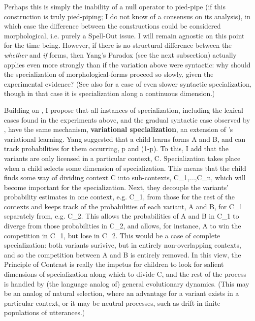 \documentclass{artikel3}
\begin{document}
\noindent Perhaps this is simply the inability of a null operator to pied-pipe (if this construction is truly pied-piping; I do not know of a consensus on its analysis), in which case the difference between the constructions could be considered morphological, i.e. purely a Spell-Out issue. I will remain agnostic on this point for the time being. However, if there is no structural difference between the \textsl{whether} and \textsl{if} forms, then Yang's Paradox (see the next subsection) actually applies even more strongly than if the variation above were syntactic: why should the specialization of morphological-forms proceed so slowly, given the experimental evidence? (See also \citealt{wallenberg2016} for a case of even slower syntactic specialization, though in that case it is specialization along a continuous dimension.)

Building on \citet{fruehwaldwallenberg2013}, I propose that all instances of specialization, including the lexical cases found in the experiments above, and the gradual syntactic case observed by \citet{baileywallenbergwurff2012}, have the same mechanism, \textbf{variational specialization}, an extension of \citet{yang2000, yang2002}'s variational learning. Yang suggested that a child learns forms A and B, and can track probabilities for them occurring, p and (1-p). To this, I add that the variants are only licensed in a particular context, C. Specialization takes place when a child selects some dimension of specialization. This means that the child finds some way of dividing context C into sub-contexts, C_1,...,C_n, which will become important for the specialization. Next, they decouple the variants’ probability estimates in one context, e.g. C_1, from those for the rest of the contexts and keeps track of the probabilities of each variant, A and B, for C_1 separately from, e.g. C_2. This allows the probabilities of A and B in C_1 to diverge from those probabilities in C_2, and allows, for instance, A to win the competition in C_1, but lose in C_2. This would be a case of complete specialization: both variants surivive, but in entirely non-overlapping contexts, and so the competition between A and B is entirely removed. In this view, the Principle of Contrast is really the impetus for children to look for salient dimensions of specialization along which to divide C, and the rest of the process is handled by (the language analog of) general evolutionary dynamics. (This may be an analog of natural selection, where an advantage for a variant exists in a particular context, or it may be neutral processes, such as drift in finite populations of utterances.)
\end{document}

